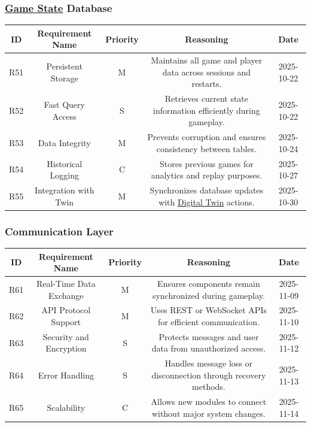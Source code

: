 \documentclass{article}
\newcommand{\DigitalTwin}{\href{https://en.wikipedia.org/wiki/Digital_twin}{Digital Twin}}
\newcommand{\GameState}{\href{https://milvus.io/ai-quick-reference/what-is-a-state-in-rl}{Game State}}
\begin{document}
\vspace{1em}

\subsubsection*{\GameState{} Database}

\begin{tabular}{|c|c|c|c|c|}
\hline
\textbf{ID} & \textbf{Requirement Name} & \textbf{Priority} &
\textbf{Reasoning} & \textbf{Date} \\
\hline
R51 & Persistent Storage & M &
\parbox[t]{4cm}{Maintains all game and player data across sessions
and restarts.} &
2025-10-22 \\
\hline
R52 & Fast Query Access & S &
\parbox[t]{4cm}{Retrieves current state information efficiently
during gameplay.} &
2025-10-22 \\
\hline
R53 & Data Integrity & M &
\parbox[t]{4cm}{Prevents corruption and ensures consistency between
tables.} &
2025-10-24 \\
\hline
R54 & Historical Logging & C &
\parbox[t]{4cm}{Stores previous games for analytics and replay
purposes.} &
2025-10-27 \\
\hline
R55 & Integration with Twin & M &
\parbox[t]{4cm}{Synchronizes database updates with \DigitalTwin{}
actions.} &
2025-10-30 \\
\hline
\end{tabular}

\vspace{1em}

\subsubsection*{Communication Layer}

\begin{tabular}{|c|c|c|c|c|}
\hline
\textbf{ID} & \textbf{Requirement Name} & \textbf{Priority} &
\textbf{Reasoning} & \textbf{Date} \\
\hline
R61 & Real-Time Data Exchange & M &
\parbox[t]{4cm}{Ensures components remain synchronized during
gameplay.} &
2025-11-09 \\
\hline
R62 & API Protocol Support & M &
\parbox[t]{4cm}{Uses REST or WebSocket APIs for efficient
communication.} &
2025-11-10 \\
\hline
R63 & Security and Encryption & S &
\parbox[t]{4cm}{Protects messages and user data from unauthorized
access.} &
2025-11-12 \\
\hline
R64 & Error Handling & S &
\parbox[t]{4cm}{Handles message loss or disconnection through
recovery methods.} &
2025-11-13 \\
\hline
R65 & Scalability & C &
\parbox[t]{4cm}{Allows new modules to connect without major system
changes.} &
2025-11-14 \\
\hline
\end{tabular}
\end{document}

